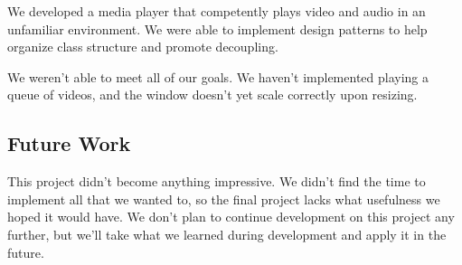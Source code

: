 \documentclass[10pt,conference,onecolumn,compsoc]{IEEEtran}
\begin{document}
We developed a media player that competently plays video and audio in an unfamiliar environment. We were able to implement design patterns to help organize class structure and promote decoupling. \medskip

We weren't able to meet all of our goals. We haven't implemented playing a queue of videos, and the window doesn't yet scale correctly upon resizing. 

\subsection{Future Work}
This project didn't become anything impressive. We didn't find the time to implement all that we wanted to, so the final project lacks what usefulness we hoped it would have. We don't plan to continue development on this project any further, but we'll take what we learned during development and apply it in the future. 

















\end{document}
